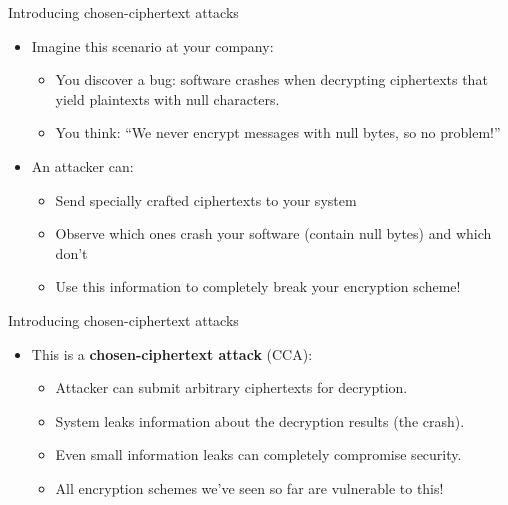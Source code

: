 \documentclass[aspectratio=169, lualatex, handout]{beamer}
\begin{document}
\begin{frame}{Introducing chosen-ciphertext attacks}
	\begin{itemize}[<+->]
		\item Imagine this scenario at your company:
		      \begin{itemize}[<+->]
			      \item You discover a bug: software crashes when decrypting ciphertexts that yield plaintexts with null characters.
			      \item You think: ``We never encrypt messages with null bytes, so no problem!''
		      \end{itemize}
		\item An attacker can:
		      \begin{itemize}[<+->]
			      \item Send specially crafted ciphertexts to your system
			      \item Observe which ones crash your software (contain null bytes) and which don't
			      \item Use this information to completely break your encryption scheme!
		      \end{itemize}
	\end{itemize}
\end{frame}

\begin{frame}{Introducing chosen-ciphertext attacks}
	\begin{itemize}
		\item This is a \textbf{chosen-ciphertext attack} (CCA):
		      \begin{itemize}[<+->]
			      \item Attacker can submit arbitrary ciphertexts for decryption.
			      \item System leaks information about the decryption results (the crash).
			      \item Even small information leaks can completely compromise security.
			      \item All encryption schemes we've seen so far are vulnerable to this!
		      \end{itemize}
	\end{itemize}
\end{frame}
\end{document}
